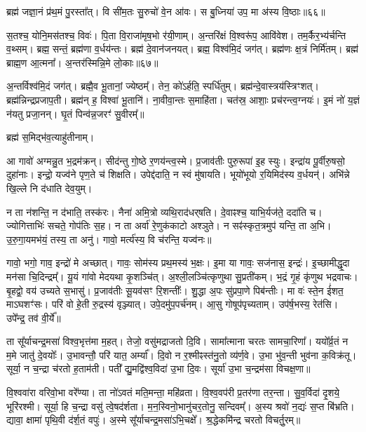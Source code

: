 ब्रह्म॑ जज्ञा॒नं प्र॑थ॒मं पु॒रस्ता᳚त्।
वि सी॑म॒तः सु॒रुचो॑ वे॒न आ॑वः।
स बु॒ध्निया॑ उप॒ मा अ॑स्य वि॒ष्ठाः॥६६॥

स॒तश्च॒ योनि॒मस॑तश्च॒ विवः॑।
पि॒ता वि॒राजा॑मृष॒भो र॑यी॒णाम्।
अ॒न्तरि॑क्षं वि॒श्वरू॑प॒ आवि॑वेश।
तम॒र्कैर॒भ्य॑र्चन्ति व॒थ्सम्।
ब्रह्म॒ सन्तं॒ ब्रह्म॑णा व॒र्धय॑न्तः।
ब्रह्म॑ दे॒वान॑जनयत्।
ब्रह्म॒ विश्व॑मि॒दं जग॑त्।
ब्रह्म॑णः क्ष॒त्रं निर्मि॑तम्।
ब्रह्म॑ ब्राह्म॒ण आ॒त्मना᳚।
अ॒न्तर॑स्मिन्नि॒मे लो॒काः॥६७॥

अ॒न्तर्विश्व॑मि॒दं जग॑त्।
ब्रह्मै॒व भू॒तानां॒ ज्येष्ठम्᳚।
तेन॒ को॑ऽर्\mbox{}हति॒ स्पर्धि॑तुम्।
ब्रह्म॑न्दे॒वास्त्रय॑स्त्रिꣳशत्।
ब्रह्म॑न्निन्द्रप्रजाप॒ती।
ब्रह्म॑न् ह॒ विश्वा॑ भू॒तानि॑।
ना॒वीवा॒न्तः स॒माहि॑ता।
चत॑स्र॒ आशाः॒ प्रच॑रन्त्व॒ग्नयः॑।
इ॒मं नो॑ य॒ज्ञं न॑यतु प्रजा॒नन्।
घृ॒तं पिन्व॑न्न॒जरꣳ॑ सु॒वीरम्᳚॥

ब्रह्म॑ स॒मिद्भ॑व॒त्याहु॑तीनाम्।

आ गावो॑ अग्मन्नु॒त भ॒द्रम॑क्रन्।
सीद॑न्तु गो॒ष्ठे र॒णय॑न्त्व॒स्मे।
प्र॒जाव॑तीः पुरु॒रूपा॑ इ॒ह स्युः।
इन्द्रा॑य पू॒र्वीरु॒षसो॒ दुहा॑नाः।
इन्द्रो॒ यज्व॑ने पृण॒ते च॑ शिक्षति।
उपेद्द॑दाति॒ न स्वं मु॑षायति।
भूयो॑भूयो र॒यिमिद॑स्य व॒र्धयन्॑।
अभि॑न्ने खि॒ल्ले नि द॑धाति देव॒युम्।

न ता न॑शन्ति॒ न द॑भाति॒ तस्क॑रः।
नैना॑ अमि॒त्रो व्यथि॒राद॑धर्‌षति।
दे॒वाꣴश्च॒ याभि॒र्यज॑ते॒ ददा॑ति च।
ज्योगित्ताभिः॑ सचते॒ गोप॑तिः स॒ह।
न ता अर्वा॑ रे॒णुक॑काटो अश्ञुते।
न सꣴ॑स्कृत॒त्रमुप॑ यन्ति॒ ता अ॒भि।
उ॒रु॒गा॒यमभ॑यं॒ तस्य॒ ता अनु॑।
गावो॒ मर्त्य॑स्य॒ वि च॑रन्ति॒ यज्व॑नः॥

गावो॒ भगो॒ गाव॒ इन्द्रो॑ मे अच्छात्।
गावः॒ सोम॑स्य प्रथ॒मस्य॑ भ॒क्षः।
इ॒मा या गावः॒ सज॑नास॒ इन्द्रः॑।
इ॒च्छामीद्धृ॒दा मन॑सा चि॒दिन्द्रम्᳚।
यू॒यं गा॑वो मेदयथा कृ॒शञ्चि॑त्।
अ॒श्ली॒लञ्चि॑त्कृणुथा सु॒प्रती॑कम्।
भ॒द्रं गृ॒हं कृ॑णुथ भद्रवाचः।
बृ॒हद्वो॒ वय॑ उच्यते स॒भासु॑।
प्र॒जाव॑तीः सू॒यव॑सꣳ रि॒शन्तीः᳚।
शु॒द्धा अ॒पः सु॑प्रपा॒णे पिब॑न्तीः।
मा वः॑ स्ते॒न ई॑शत॒ माऽघशꣳ॑सः।
परि॑ वो हे॒ती रु॒द्रस्य॑ वृञ्ज्यात्।
उपे॒दमु॑प॒पर्च॑नम्।
आ॒सु गोषूप॑पृच्यताम्।
उप॑र्\mbox{}ष॒भस्य॒ रेत॑सि।
उपे᳚न्द्र॒ तव॑ वी॒र्ये᳚॥

ता सू᳚र्याचन्द्र॒मसा॑ विश्व॒भृत्त॑मा म॒हत्।
तेजो॒ वसु॑मद्राजतो दि॒वि।
सामा᳚त्माना चरतः सामचा॒रिणा᳚।
ययो᳚र्व्र॒तं न म॒मे जातु॑ दे॒वयोः᳚।
उ॒भावन्तौ॒ परि॑ यात॒ अर्म्या᳚।
दि॒वो न र॒श्मीꣴस्त॑नु॒तो व्य॑र्ण॒वे।
उ॒भा भु॑व॒न्ती भुव॑ना क॒विक्र॑तू।
सूर्या॒ न च॒न्द्रा च॑रतो ह॒ताम॑ती।
पती᳚ द्यु॒मद्वि॑श्व॒विदा॑ उ॒भा दि॒वः।
सूर्या॑ उ॒भा च॒न्द्रम॑सा विचक्ष॒णा॥

वि॒श्ववा॑रा वरिवो॒भा वरे᳚ण्या।
ता नो॑ऽवतं मति॒मन्ता॒ महि॑व्रता।
वि॒श्व॒वप॑री प्र॒तर॑णा तर॒न्ता।
सु॒व॒र्विदा॑ दृ॒शये॒ भूरि॑रश्मी।
सूर्या॒ हि च॒न्द्रा वसु॑ त्वे॒षद॑र्\mbox{}शता।
म॒न॒स्विनो॒भानु॑चर॒तोनु॒ सन्दिवम्᳚।
अ॒स्य श्रवो॑ न॒द्यः॑ स॒प्त बि॑भ्रति।
द्यावा॒ क्षामा॑ पृथि॒वी द॑र्\mbox{}श॒तं वपुः॑।
अ॒स्मे सू᳚र्याचन्द्र॒मसा॑ऽभि॒चक्षे᳚।
श्र॒द्धेकमि॑न्द्र चरतो विचर्तु॒रम्॥

